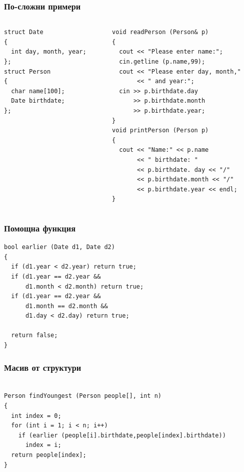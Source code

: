 \documentclass{beamer}
\begin{document}
\begin{frame}[fragile]
\frametitle{По-сложни примери} 

\begin{columns}[t]
  \begin{column}{0.4\textwidth}

\begin{lstlisting}
struct Date
{
  int day, month, year;
};
struct Person
{
  char name[100];
  Date birthdate;
};
\end{lstlisting} 

  \end{column}
  \begin{column}{0.6\textwidth}
\pause
{}
\begin{lstlisting}
void readPerson (Person& p)
{
  cout << "Please enter name:";
  cin.getline (p.name,99);
  cout << "Please enter day, month,"
       << " and year:";
  cin >> p.birthdate.day 
      >> p.birthdate.month 
      >> p.birthdate.year;
}
void printPerson (Person p)
{
  cout << "Name:" << p.name 
       << " birthdate: " 
       << p.birthdate. day << "/" 
       << p.birthdate.month << "/"
       << p.birthdate.year << endl;
}

\end{lstlisting}  
  \end{column}
\end{columns}

 

\end{frame}


\begin{frame}[fragile]
\frametitle{Помощна функция} 

\begin{lstlisting}
bool earlier (Date d1, Date d2)
{
  if (d1.year < d2.year) return true;
  if (d1.year == d2.year && 
      d1.month < d2.month) return true;
  if (d1.year == d2.year && 
      d1.month == d2.month && 
      d1.day < d2.day) return true;

  return false;
}

\end{lstlisting}  

\end{frame}


\begin{frame}[fragile]
\frametitle{Масив от структури} 

\begin{lstlisting}

Person findYoungest (Person people[], int n)
{
  int index = 0;
  for (int i = 1; i < n; i++)
    if (earlier (people[i].birthdate,people[index].birthdate))
      index = i;
  return people[index];
}


\end{lstlisting}  

\end{frame}
\end{document}
